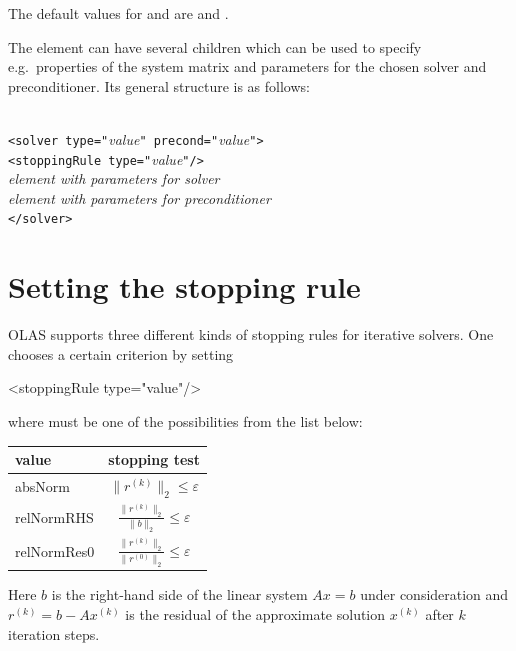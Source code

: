 %
%
The default values for  and  are
 and
.
%
%

The  element can have several children which can be used to
specify
e.g.~properties of the system matrix and parameters for the chosen solver and
preconditioner. Its general structure is as follows:
%
%
 \begin{center}
 \begin{minipage}{0.6\textwidth}
\begin{tabbing}
\quad\=\\ \kill
\verb!<solver type="!\emph{value}\verb!" precond="!\emph{value}\verb!">!\\
\> \verb!<stoppingRule type="!\emph{value}\verb!"/>!\\
\> \emph{element with parameters for solver}\\
\> \emph{element with parameters for preconditioner}\\
\verb!</solver>!\\
\end{tabbing}
 \end{minipage}
 \end{center}
%
%
\section{Setting the stopping rule}
%
%
OLAS supports three different kinds of stopping rules for iterative solvers.
One chooses a certain criterion by setting
%
%
\begin{xmllisting}
<stoppingRule type="value"/>
\end{xmllisting}
%
%
where  must be one of the possibilities from the list below:
%
%
\begin{center}
\begin{tabular}{lc}
\toprule
value & stopping test \\
\midrule
{absNorm}     & $\displaystyle\|r^{(k)}\|_2 \leqslant \varepsilon$\\
\midrule
{relNormRHS}  & $\displaystyle\frac{\|r^{(k)}\|_2}{\|b\|_2} \leqslant
 \varepsilon$\\
\midrule
{relNormRes0} & $\displaystyle\frac{\|r^{(k)}\|_2}{\|r^{(0)}\|_2}\leqslant
\varepsilon$\\
\bottomrule
\end{tabular}
\end{center}
%
%
Here $b$ is the right-hand side of the linear system $Ax=b$ under consideration
and $r^{(k)}=b - Ax^{(k)}$ is the residual of the approximate solution
$x^{(k)}$ after $k$ iteration steps.

